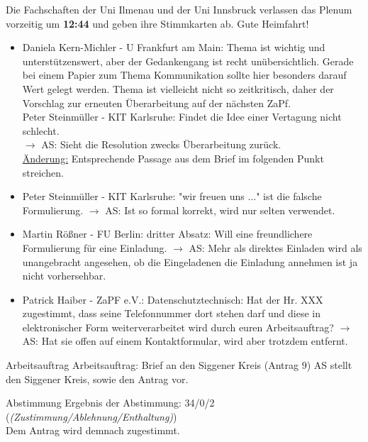     \begin{info}{}
      Die Fachschaften der Uni Ilmenau und der Uni Innsbruck verlassen das Plenum vorzeitig um \textbf{12:44} und geben ihre Stimmkarten ab. Gute Heimfahrt!
    \end{info}

    \begin{itemize}
      \item Daniela Kern-Michler - U Frankfurt am Main: Thema ist wichtig und unterstützenswert, aber der Gedankengang ist recht unübersichtlich. Gerade bei einem Papier zum Thema Kommunikation sollte hier besonders darauf Wert gelegt werden. Thema ist vielleicht nicht so zeitkritisch, daher der  Vorschlag zur erneuten Überarbeitung auf der nächsten ZaPf. \\
      Peter Steinmüller - KIT Karlsruhe: Findet die Idee einer Vertagung nicht schlecht. \\
      $\rightarrow$ AS: Sieht die Resolution zwecks Überarbeitung zurück. \\
      \underline{Änderung:} Entsprechende Passage aus dem Brief im folgenden Punkt streichen.
      \item Peter Steinmüller - KIT Karlsruhe: "wir freuen uns ..." ist die falsche Formulierung. $\rightarrow$ AS: Ist so formal korrekt, wird nur selten verwendet.
      \item Martin Rößner - FU Berlin: dritter Absatz: Will eine freundlichere Formulierung für eine Einladung. $\rightarrow$ AS: Mehr als direktes Einladen wird als unangebracht angesehen, ob die Eingeladenen die Einladung annehmen ist ja nicht vorhersehbar.
      \item Patrick Haiber - ZaPF e.V.: Datenschutztechnisch: Hat der Hr. XXX zugestimmt, dass seine Telefonnummer dort stehen darf und diese in elektronischer Form weiterverarbeitet wird durch euren Arbeitsauftrag? $\rightarrow$ AS: Hat sie offen auf einem Kontaktformular, wird aber trotzdem entfernt.
    \end{itemize}

    \begin{info}{Arbeitsauftrag}
      Arbeitsauftrag: Brief an den Siggener Kreis (Antrag 9)
      AS stellt den Siggener Kreis, sowie den Antrag vor.
    \end{info}

    \begin{success}{Abstimmung}
      Ergebnis der Abstimmung: 34/0/2 (\textit{(Zustimmung/Ablehnung/Enthaltung)}) \\
      Dem Antrag wird demnach zugestimmt.
    \end{success}

